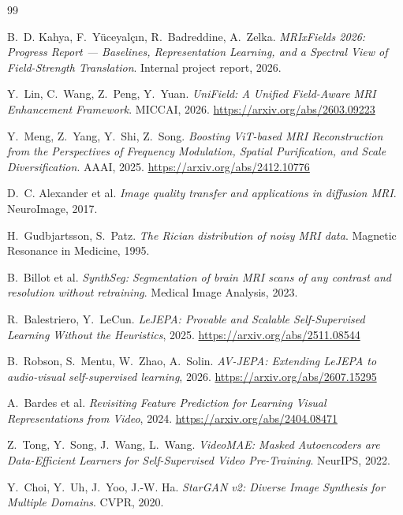 \documentclass[11pt,a4paper]{article}
\begin{document}
\begin{thebibliography}{99}
\small

B.~D. Kahya, F.~Yüceyalçın, R.~Badreddine, A.~Zelka. \emph{MRIxFields 2026: Progress Report --- Baselines,
Representation Learning, and a Spectral View of Field-Strength Translation}. Internal project report,
2026.

Y.~Lin, C.~Wang, Z.~Peng, Y.~Yuan. \emph{UniField: A Unified Field-Aware MRI Enhancement Framework}.
MICCAI, 2026. \url{https://arxiv.org/abs/2603.09223}

Y.~Meng, Z.~Yang, Y.~Shi, Z.~Song. \emph{Boosting ViT-based MRI Reconstruction from the Perspectives of
Frequency Modulation, Spatial Purification, and Scale Diversification}. AAAI, 2025.
\url{https://arxiv.org/abs/2412.10776}

D.~C. Alexander et al. \emph{Image quality transfer and applications in diffusion MRI}. NeuroImage, 2017.

H.~Gudbjartsson, S.~Patz. \emph{The Rician distribution of noisy MRI data}. Magnetic Resonance in
Medicine, 1995.

B.~Billot et al. \emph{SynthSeg: Segmentation of brain MRI scans of any contrast and resolution without
retraining}. Medical Image Analysis, 2023.

R.~Balestriero, Y.~LeCun. \emph{LeJEPA: Provable and Scalable Self-Supervised Learning Without the
Heuristics}, 2025. \url{https://arxiv.org/abs/2511.08544}

B.~Robson, S.~Mentu, W.~Zhao, A.~Solin. \emph{AV-JEPA: Extending LeJEPA to audio-visual self-supervised
learning}, 2026. \url{https://arxiv.org/abs/2607.15295}

A.~Bardes et al. \emph{Revisiting Feature Prediction for Learning Visual Representations from Video},
2024. \url{https://arxiv.org/abs/2404.08471}

Z.~Tong, Y.~Song, J.~Wang, L.~Wang. \emph{VideoMAE: Masked Autoencoders are Data-Efficient Learners for
Self-Supervised Video Pre-Training}. NeurIPS, 2022.

Y.~Choi, Y.~Uh, J.~Yoo, J.-W. Ha. \emph{StarGAN v2: Diverse Image Synthesis for Multiple Domains}.
CVPR, 2020.

\end{thebibliography}
\end{document}
